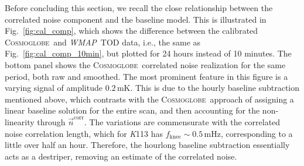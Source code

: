 \documentclass[twocolumn]{../../common/aa}
\def\WMAP{\emph{WMAP}}
\def\Planck{\emph{Planck}}
\newcommand{\n}[0]{\vec{n}}
\newcommand{\cosmoglobe}{\textsc{Cosmoglobe}}
\newcommand{\K}[0]{\textit K}
\newcommand{\Ka}[0]{\textit{Ka}}
\begin{document}
Before concluding this section, we recall the close relationship between the correlated noise component and the baseline model. This is illustrated in Fig.~\ref{fig:cal_comp}, which shows the difference between the calibrated \cosmoglobe\ and \WMAP\ TOD data, i.e., the same as Fig.~\ref{fig:cal_comp_10min}, but plotted for 24 hours instead of 10 minutes. The bottom panel shows the \cosmoglobe\ correlated noise realization for the same period, both raw and smoothed. The most prominent feature in this figure is a varying signal of amplitude $0.2\,\mathrm{mK}$. This is due to the hourly baseline subtraction mentioned above, which contrasts with the \cosmoglobe\ approach of assigning a linear baseline solution for the entire scan, and then accounting for the non-linearity through $\n^{\mathrm{corr}}$. The variations are commensurate with the correlated noise correlation length, which for \K113 has ${f_\mathrm{knee}\sim0.5\,\mathrm{mHz}}$, corresponding to a little over half an hour. Therefore, the hourlong baseline subtraction essentially acts as a destriper, removing an estimate of the correlated noise. 










%






\end{document}
